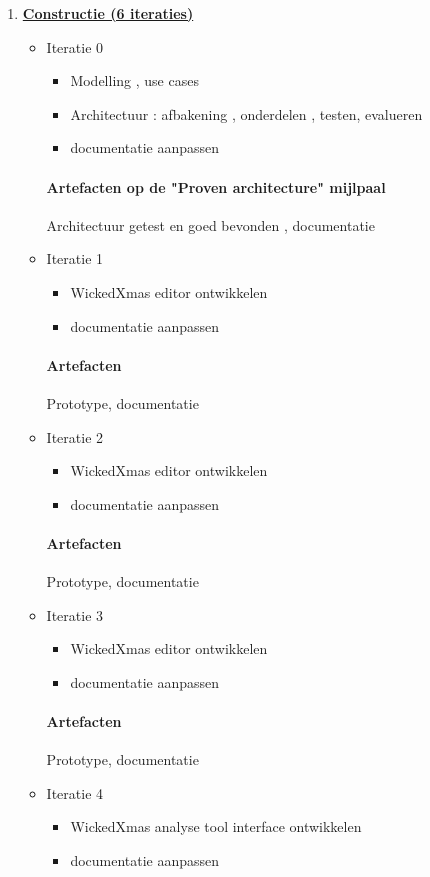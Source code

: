\begin{enumerate}
\item \underline{\textbf{Constructie (6 iteraties)}}
	\begin{itemize}
	\item Iteratie 0
		\begin{itemize}
		\item Modelling , use cases
		\item Architectuur : afbakening , onderdelen , testen, evalueren
		\item documentatie aanpassen
		\end{itemize}
		\paragraph{Artefacten op de "Proven architecture" mijlpaal}
		 Architectuur getest en goed bevonden , documentatie
	\item Iteratie 1
		\begin{itemize}
		\item WickedXmas editor ontwikkelen
		\item documentatie aanpassen
		\end{itemize}
		\paragraph{Artefacten}
		Prototype, documentatie
	\item Iteratie 2
		\begin{itemize}
		\item WickedXmas editor ontwikkelen
		\item documentatie aanpassen
		\end{itemize}
		\paragraph{Artefacten}
		Prototype, documentatie
	\item Iteratie 3
		\begin{itemize}
		\item WickedXmas editor ontwikkelen
		\item documentatie aanpassen
		\end{itemize}
		\paragraph{Artefacten}
		Prototype, documentatie
	\item Iteratie 4
		\begin{itemize}
		\item WickedXmas analyse tool interface ontwikkelen
		\item documentatie aanpassen
		\end{itemize}

\end{itemize}
\end{enumerate}
